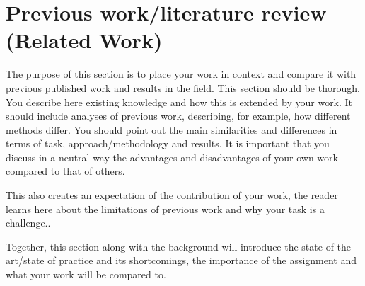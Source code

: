 \section{Previous work/literature review (Related Work)}

The purpose of this section is to place your work in context and compare it with previous published work and results in the field. This section should be thorough. You describe here existing knowledge and how this is extended by your work. It should include analyses of previous work, describing, for example, how different methods differ. You should point out the main similarities and differences in terms of task, approach/methodology and results. It is important that you discuss in a neutral way the advantages and disadvantages of your own work compared to that of others.

This also creates an expectation of the contribution of your work, the reader learns here about the limitations of previous work and why your task is a challenge.. 

Together, this section along with the background will introduce the state of the art/state of practice and its shortcomings, the importance of the assignment and what your work will be compared to.

